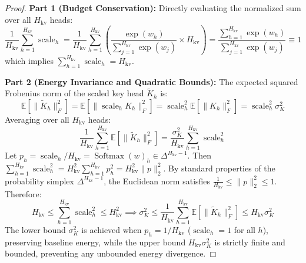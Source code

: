 \documentclass{article}
\begin{document}
\begin{proof}
\textbf{Part 1 (Budget Conservation):}
Directly evaluating the normalized sum over all $H_{\text{kv}}$ heads:
\begin{equation}
    \frac{1}{H_{\text{kv}}} \sum_{h=1}^{H_{\text{kv}}} \operatorname{scale}_h = \frac{1}{H_{\text{kv}}} \sum_{h=1}^{H_{\text{kv}}} \left( \frac{\exp(w_h)}{\sum_{j=1}^{H_{\text{kv}}} \exp(w_j)} \times H_{\text{kv}} \right) = \frac{\sum_{h=1}^{H_{\text{kv}}} \exp(w_h)}{\sum_{j=1}^{H_{\text{kv}}} \exp(w_j)} \equiv 1
\end{equation}
which implies $\sum_{h=1}^{H_{\text{kv}}} \operatorname{scale}_h = H_{\text{kv}}$.

\textbf{Part 2 (Energy Invariance and Quadratic Bounds):}
The expected squared Frobenius norm of the scaled key head $\tilde{K}_h$ is:
\begin{equation}
    \mathbb{E}[\|\tilde{K}_h\|_F^2] = \mathbb{E}[\|\operatorname{scale}_h K_h\|_F^2] = \operatorname{scale}_h^2 \mathbb{E}[\|K_h\|_F^2] = \operatorname{scale}_h^2 \sigma_K^2
\end{equation}
Averaging over all $H_{\text{kv}}$ heads:
\begin{equation}
    \frac{1}{H_{\text{kv}}} \sum_{h=1}^{H_{\text{kv}}} \mathbb{E}[\|\tilde{K}_h\|_F^2] = \frac{\sigma_K^2}{H_{\text{kv}}} \sum_{h=1}^{H_{\text{kv}}} \operatorname{scale}_h^2
\end{equation}
Let $p_h = \operatorname{scale}_h / H_{\text{kv}} = \operatorname{Softmax}(w)_h \in \Delta^{H_{\text{kv}}-1}$. Then $\sum_{h=1}^{H_{\text{kv}}} \operatorname{scale}_h^2 = H_{\text{kv}}^2 \sum_{h=1}^{H_{\text{kv}}} p_h^2 = H_{\text{kv}}^2 \|p\|_2^2$. By standard properties of the probability simplex $\Delta^{H_{\text{kv}}-1}$, the Euclidean norm satisfies $\frac{1}{H_{\text{kv}}} \le \|p\|_2^2 \le 1$. Therefore:
\begin{equation}
    H_{\text{kv}} \le \sum_{h=1}^{H_{\text{kv}}} \operatorname{scale}_h^2 \le H_{\text{kv}}^2 \implies \sigma_K^2 \le \frac{1}{H_{\text{kv}}} \sum_{h=1}^{H_{\text{kv}}} \mathbb{E}\left[\|\tilde{K}_h\|_F^2\right] \le H_{\text{kv}} \sigma_K^2
\end{equation}
The lower bound $\sigma_K^2$ is achieved when $p_h = 1/H_{\text{kv}}$ ($\operatorname{scale}_h = 1$ for all $h$), preserving baseline energy, while the upper bound $H_{\text{kv}}\sigma_K^2$ is strictly finite and bounded, preventing any unbounded energy divergence.


\end{proof}
\end{document}
